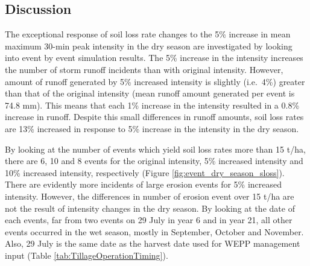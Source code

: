 %
%
%


\subsection{Discussion}
\label{sec:EstimationOfFutureSoilErosionDiscussion}

The exceptional response of soil loss rate changes to the 5\% increase in mean
maximum 30-min peak intensity in the dry season are investigated by looking into
event by event simulation results. The 5\% increase in the intensity increases
the number of storm runoff incidents than with original intensity. However,
amount of runoff generated by 5\% increased intensity is slightly (i.e.\ 4\%)
greater than that of the original intensity (mean runoff amount generated per
event is 74.8 mm). This means that each 1\% increase in the intensity resulted
in a 0.8\% increase in runoff. Despite this small differences in runoff amounts,
soil loss rates are 13\% increased in response to 5\% increase in the intensity
in the dry season.

By looking at the number of events which yield soil loss rates more than 15
t/ha, there are 6, 10 and 8 events for the original intensity, 5\% increased
intensity and 10\% increased intensity, respectively (Figure
\ref{fig:event_dry_season_sloss}). There are evidently more incidents of large
erosion events for 5\% increased intensity. However, the differences in number
of erosion event over 15 t/ha are not the result of intensity changes in the dry
season. By looking at the date of each events, far from two events on 29 July in
year 6 and in year 21, all other events occurred in the wet season, mostly in
September, October and November. Also, 29 July is the same date as the harvest
date used for WEPP management input (Table \ref{tab:TillageOperationTiming}).


